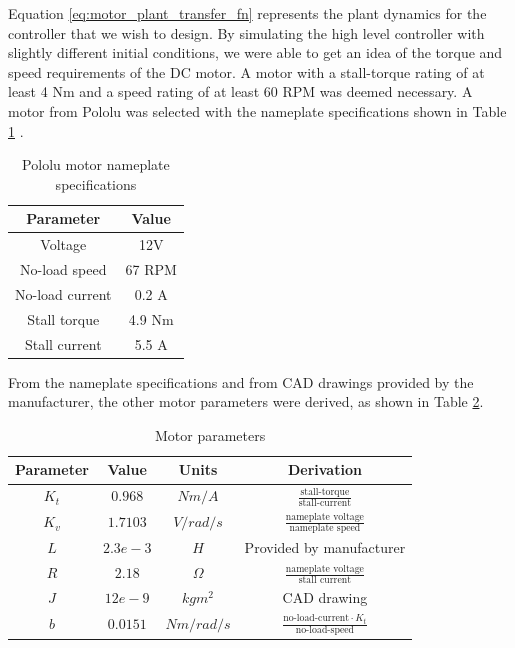 \documentclass{report}
\begin{document}
Equation \ref{eq:motor_plant_transfer_fn} represents the plant dynamics for the controller that we wish to design. By simulating the high level controller with slightly different initial conditions, we were able to get an idea of the torque and speed requirements of the DC motor. A motor with a stall-torque rating of at least 4 Nm and a speed rating of at least 60 RPM was deemed necessary. A motor from Pololu was selected with the nameplate specifications shown in Table \ref{table:pololu_specs} \cite{pololu_motor_specs}.


\begin{table}
\begin{center}
\begin{tabular}{|c|c|}
\hline
\textbf{Parameter} & \textbf{Value }\\
\hline\hline
Voltage & 12V \\
\hline
No-load speed & 67 RPM \\
\hline
No-load current & 0.2 A \\
\hline
Stall torque & 4.9 Nm \\
\hline
Stall current & 5.5 A \\
\hline
\end{tabular}
\caption{Pololu motor nameplate specifications} \label{table:pololu_specs}
\end{center}
\end{table}


From the nameplate specifications and from CAD drawings provided by the manufacturer, the other motor parameters were derived, as shown in Table \ref{table:pololu_motor_params}.


\begin{table}
\begin{center}
\begin{tabular}{|c|c|c|c|}
\hline
\textbf{Parameter} & \textbf{Value} & \textbf{Units} & \textbf{Derivation} \\
\hline \hline
$K_t$ & $0.968$ & $Nm/A$ & $\frac{\text{stall-torque}}{\text{stall-current}}$ \\
\hline
$K_v$ & $1.7103$ & $V/rad/s$ & $\frac{\text{nameplate voltage}}{\text{nameplate speed}}$ \\
\hline
$L$ & $2.3e-3$ & $H$ & Provided by manufacturer \\
\hline
$R$ & $2.18$ & $\Omega$ & $\frac{\text{nameplate voltage}}{\text{stall current}}$ \\
\hline
$J$ & $12e-9$ & $kgm^2$ & CAD drawing \\
\hline
$b$ & $0.0151$ & $Nm/rad/s$ & $\frac{\text{no-load-current} \cdot K_t}{\text{no-load-speed}}$ \\
\hline
\end{tabular}
\caption{Motor parameters} \label{table:pololu_motor_params}
\end{center}
\end{table}


 

\end{document}
